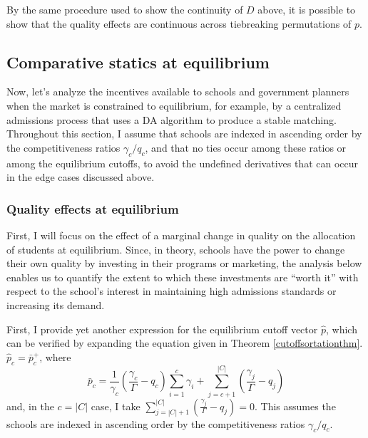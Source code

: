 \documentclass[12pt]{article}
\theoremstyle{definition}
\begin{document}
By the same procedure used to show the continuity of $D$ above, it is possible to show that the quality effects are continuous across tiebreaking permutations of $p$.





\subsection{Comparative statics at equilibrium} \label{compstateq}
Now, let's analyze the incentives available to schools and government planners when the market is constrained to equilibrium, for example, by a centralized admissions process that uses a DA algorithm to produce a stable matching. Throughout this section, I assume that schools are indexed in ascending order by the competitiveness ratios $\gamma_c / q_c$, and that no ties occur among these ratios or among the equilibrium cutoffs, to avoid the undefined derivatives that can occur in the edge cases discussed above. 

\subsubsection{Quality effects at equilibrium} \label{qualityeffectsateq}
First, I will focus on the effect of a marginal change in quality on the allocation of students at equilibrium. Since, in theory, schools have the power to change their own quality by investing in their programs or marketing, the analysis below enables us to quantify the extent to which these investments are ``worth it'' with respect to the school's interest in maintaining high admissions standards or increasing its demand. 

First, I provide yet another expression for the equilibrium cutoff vector $\hat p$, which can be verified by expanding the equation given in Theorem \ref{cutoffsortationthm}. $\hat p_c = \bar p_c^+$, where
\begin{equation} \label{yetanothereqcutoff}
\bar p_c = 
\frac{1}{\gamma_c} \left(\frac{\gamma_c}{\Gamma} - q_c\right) \sum_{i=1}^{c} \gamma_i 
+ \sum_{j=c+1}^{|C|} \left( \frac{\gamma_j}{\Gamma} - q_j \right)
\end{equation}
and, in the $c = |C|$ case, I take $\sum_{j=|C|+1}^{|C|} \left( \frac{\gamma_j}{\Gamma} - q_j \right)= 0$. This assumes the schools are indexed in ascending order by the competitiveness ratios $\gamma_c / q_c$. 
\end{document}
